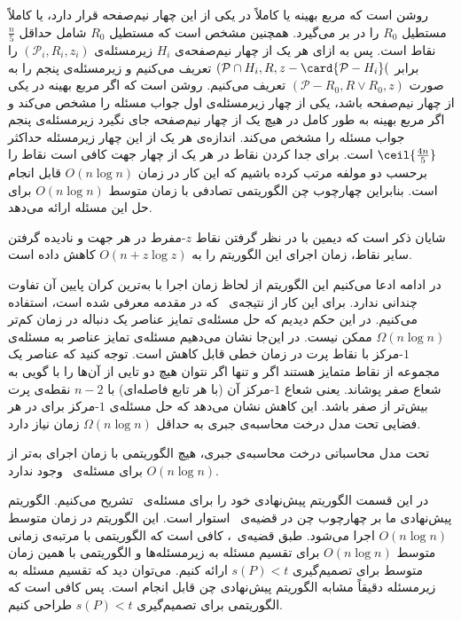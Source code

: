 روشن است که مربع بهینه یا کاملاً در یکی از این چهار نیم‌صفحه قرار دارد، یا کاملاً مستطیل $R_0$ را در بر می‌گیرد. همچنین مشخص است که مستطیل $R_0$ شامل حداقل $\frac{n}{5}$ نقاط است. پس به ازای هر یک از چهار نیم‌صفحه‌ی $H_i$ زیرمسئله‌ی
$(\mathcal{P}_i, R_i, z_i)$
را برابر
$(\mathcal{P} \cap H_i, R, z - \card{\mathcal{P} - H_i}($
تعریف می‌کنیم و زیرمسئله‌ی پنجم را به صورت
$(\mathcal{P} - R_0, R \vee R_0, z)$
تعریف می‌کنیم. روشن است که اگر مربع بهینه در یکی از چهار نیم‌صفحه باشد، یکی از چهار زیرمسئله‌ی اول جواب مسئله را مشخص می‌کند و اگر مربع بهینه به طور کامل در هیچ یک از چهار نیم‌صفحه جای نگیرد زیرمسئله‌ی پنجم جواب مسئله را مشخص می‌کند. اندازه‌ی هر یک از این چهار زیرمسئله حداکثر
$\ceil{\frac{4n}{5}}$
است. برای جدا کردن نقاط در هر یک از چهار جهت کافی است نقاط را برحسب دو مولفه مرتب کرده باشیم که این کار در زمان $O(n \log n)$ قابل انجام است. بنابراین چهارچوب چن الگوریتمی تصادفی با زمان متوسط $O(n \log n)$ برای حل این مسئله ارائه می‌دهد.

شایان ذکر است که دیمین  با در نظر گرفتن نقاط $z$-مفرط در هر جهت و نادیده گرفتن سایر نقاط، زمان اجرای این الگوریتم را به $O(n + z \log z)$ کاهش داده است.

در ادامه ادعا می‌کنیم این الگوریتم از لحاظ زمان اجرا با به‌ترین کران پایین آن تفاوت چندانی ندارد. برای این کار از نتیجه‌ی~ که در مقدمه معرفی شده است، استفاده می‌کنیم. در این حکم دیدیم که حل مسئله‌ی تمایز عناصر یک دنباله در زمان کم‌تر $\Omega(n \log n)$ ممکن نیست. در این‌جا نشان می‌دهیم مسئله‌ی تمایز عناصر به مسئله‌ی $1$-مرکز با نقاط پرت در زمان خطی قابل کاهش است. توجه کنید که عناصر یک مجموعه از نقاط متمایز هستند اگر و تنها اگر نتوان هیچ دو تایی از آن‌ها را با گویی به شعاع صفر پوشاند. یعنی شعاع $1$-مرکز آن (با هر تابع فاصله‌ای) با $n-2$ نقطه‌ی پرت بیش‌تر از صفر باشد. این کاهش نشان می‌دهد که حل مسئله‌ی $1$-مرکز برای در هر فضایی تحت مدل درخت محاسبه‌ی جبری به حداقل $\Omega(n \log n)$ زمان نیاز دارد.

تحت مدل محاسباتی درخت محاسبه‌ی جبری، هیچ الگوریتمی با زمان اجرای به‌تر از $O(n \log n)$ برای مسئله‌ی~ وجود ندارد.



در این قسمت الگوریتم پیش‌نهادی خود را برای مسئله‌ی~ تشریح می‌کنیم. الگوریتم پیش‌نهادی ما بر چهارچوب چن در قضیه‌ی~ استوار است. این الگوریتم در زمان متوسط $O(n \log n)$ اجرا می‌شود. طبق قضیه‌ی~، کافی است که الگوریتمی با مرتبه‌ی زمانی متوسط $O(n \log n)$ برای تقسیم مسئله به زیرمسئله‌ها و الگوریتمی با همین زمان متوسط برای تصمیم‌گیری $s(P) < t$ ارائه کنیم. می‌توان دید که تقسیم مسئله به زیرمسئله دقیقاً مشابه الگوریتم پیش‌نهادی چن قابل انجام است. پس کافی است که الگوریتمی برای تصمیم‌گیری $s(P) < t$ طراحی کنیم.

